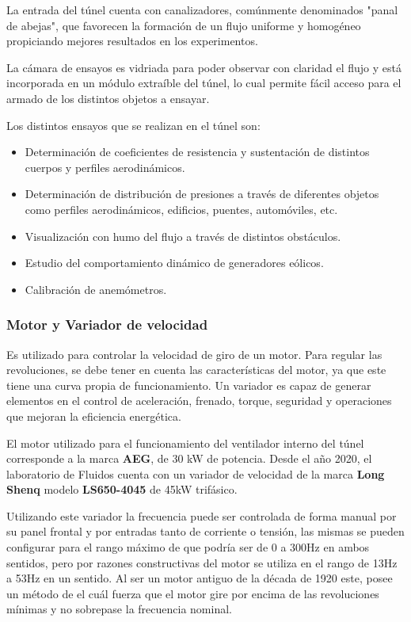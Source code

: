 	La entrada del túnel cuenta con canalizadores, comúnmente denominados "panal de abejas", que favorecen la formación de un flujo uniforme y homogéneo propiciando mejores resultados en los experimentos.
	
	La cámara de ensayos es vidriada para poder observar con claridad el flujo y está incorporada en un módulo extraíble del túnel, lo cual permite fácil acceso para el armado de los distintos objetos a ensayar.
	
	Los distintos ensayos que se realizan en el túnel son:
	\begin{itemize}
		\item  Determinación de coeficientes de resistencia y sustentación de distintos cuerpos y perfiles aerodinámicos. 
		\item Determinación de distribución de presiones a través de diferentes objetos como perfiles aerodinámicos, edificios, puentes, automóviles, etc.
		\item Visualización con humo del flujo a través de distintos obstáculos.
		\item Estudio del comportamiento dinámico de generadores eólicos. 
		\item Calibración de anemómetros.
	\end{itemize}

	\subsubsection{Motor y Variador de velocidad}
		\begin{tcolorbox}[colback=blue!5!white,colframe=blue!75!black,title=Variador de velocidad]
			Es utilizado para controlar la velocidad de giro de un motor. Para regular las revoluciones, se debe tener en cuenta las características del motor, ya que este tiene  una  curva  propia  de  funcionamiento.  Un  variador  es  capaz  de  generar elementos en el  control  de  aceleración,  frenado, torque,  seguridad  y operaciones que mejoran la eficiencia energética.\end{tcolorbox}	

		
El motor utilizado para el funcionamiento del ventilador interno del túnel corresponde a la marca \textbf{AEG}, de 30 kW de potencia\cite{barila1993desarrollo}. Desde el año 2020, el laboratorio de Fluidos cuenta con un variador de velocidad de la marca \textbf{Long Shenq} modelo \textbf{LS650-4045} de 45kW trifásico.
 
Utilizando este variador la frecuencia puede ser controlada de forma manual por su panel frontal y por entradas tanto de corriente o tensión, las mismas se pueden configurar para el rango máximo de que podría ser de 0 a 300Hz en ambos sentidos, pero por razones constructivas del motor se utiliza en el rango de 13Hz a 53Hz en un sentido. Al ser un motor antiguo de la década de 1920 este, posee un método de  el cuál fuerza que el motor gire por encima de las revoluciones mínimas y no sobrepase la frecuencia nominal.


